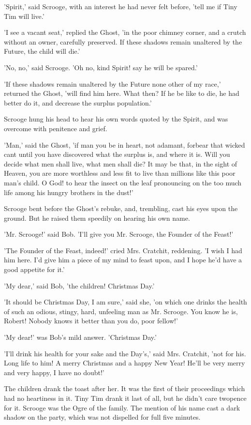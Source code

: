'Spirit,' said Scrooge, with an interest he had never felt before, 'tell
me if Tiny Tim will live.'

'I see a vacant seat,' replied the Ghost, 'in the poor chimney corner,
and a crutch without an owner, carefully preserved. If these shadows
remain unaltered by the Future, the child will die.'

'No, no,' said Scrooge. 'Oh no, kind Spirit! say he will be spared.'

'If these shadows remain unaltered by the Future none other of my race,'
returned the Ghost, 'will find him here. What then? If he be like to
die, he had better do it, and decrease the surplus population.'

Scrooge hung his head to hear his own words quoted by the Spirit, and
was overcome with penitence and grief.

'Man,' said the Ghost, 'if man you be in heart, not adamant, forbear
that wicked cant until you have discovered what the surplus is, and
where it is. Will you decide what men shall live, what men shall die? It
may be that, in the sight of Heaven, you are more worthless and less fit
to live than millions like this poor man's child. O God! to hear the
insect on the leaf pronouncing on the too much life among his hungry
brothers in the dust!'

Scrooge bent before the Ghost's rebuke, and, trembling, cast his eyes
upon the ground. But he raised them speedily on hearing his own name.

'Mr. Scrooge!' said Bob. 'I'll give you Mr. Scrooge, the Founder of the
Feast!'

'The Founder of the Feast, indeed!' cried Mrs. Cratchit, reddening. 'I
wish I had him here. I'd give him a piece of my mind to feast upon, and
I hope he'd have a good appetite for it.'

'My dear,' said Bob, 'the children! Christmas Day.'

'It should be Christmas Day, I am sure,' said she, 'on which one drinks
the health of such an odious, stingy, hard, unfeeling man as Mr.
Scrooge. You know he is, Robert! Nobody knows it better than you do,
poor fellow!'

'My dear!' was Bob's mild answer. 'Christmas Day.'

'I'll drink his health for your sake and the Day's,' said Mrs. Cratchit,
'not for his. Long life to him! A merry Christmas and a happy New Year!
He'll be very merry and very happy, I have no doubt!'

The children drank the toast after her. It was the first of their
proceedings which had no heartiness in it. Tiny Tim drank it last of
all, but he didn't care twopence for it. Scrooge was the Ogre of the
family. The mention of his name cast a dark shadow on the party, which
was not dispelled for full five minutes.

